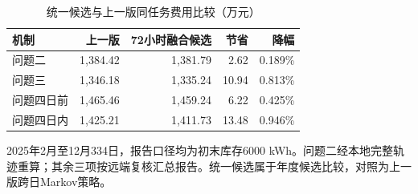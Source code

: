 \begin{table}[htbp]\centering\small
\caption{统一候选与上一版同任务费用比较（万元）}\label{tab:main}
\begin{tabular}{lrrrr}\toprule
机制&上一版&72小时融合候选&节省&降幅\\\midrule
问题二 & 1,384.42 & 1,381.79 & 2.62 & 0.189\% \\
问题三 & 1,346.18 & 1,335.24 & 10.94 & 0.813\% \\
问题四日前 & 1,465.46 & 1,459.24 & 6.22 & 0.425\% \\
问题四日内 & 1,425.21 & 1,411.73 & 13.48 & 0.946\% \\
\bottomrule\end{tabular}\par\vspace{2mm}
\begin{minipage}{.95\linewidth}\footnotesize
2025年2月至12月334日，报告口径均为初末库存6000 kWh。问题二经本地完整轨迹重算；其余三项按远端复核汇总报告。统一候选属于年度候选比较，对照为上一版跨日Markov策略。
\end{minipage}\end{table}

